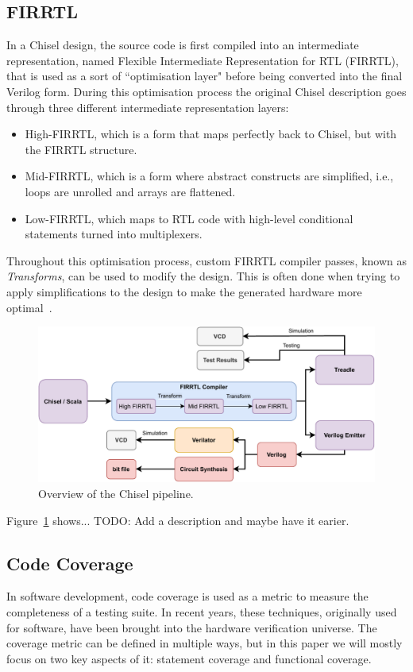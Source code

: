 \documentclass[runningheads]{llncs}
\newcommand{\todo}[1]{{\color{olive} TODO: #1}}
\begin{document}
\subsection{FIRRTL}
In a Chisel design, the source code is first compiled into an intermediate representation, named Flexible Intermediate Representation for RTL (FIRRTL), that is used as a sort of ``optimisation layer" before being converted into the final Verilog form. During this optimisation process the original Chisel description goes through three different intermediate representation layers:
\begin{itemize}
\item High-FIRRTL, which is a form that maps perfectly back to Chisel, but with the FIRRTL structure.
\item Mid-FIRRTL, which is a form where abstract constructs are simplified, i.e., loops are unrolled and arrays are flattened.
\item Low-FIRRTL, which maps to RTL code with high-level conditional statements turned into multiplexers.
\end{itemize}
Throughout this optimisation process, custom FIRRTL compiler passes, known as \textit{Transforms}, can be used to modify the design. This is often done when trying to apply simplifications to the design to make the generated hardware more optimal~\cite{firrtl}.  

\begin{figure}
    \centering
    \includegraphics[width=\textwidth]{Chisel_FIRRTL_VERILOG.pdf}
    \caption{Overview of the Chisel pipeline.}
\label{fig:chisel}
\end{figure}


Figure~\ref{fig:chisel} shows... \todo{Add a description and maybe have it earier.}

\subsection{Code Coverage}
In software development, code coverage is used as a metric to measure the completeness of a testing suite. In recent years, these techniques, originally used for software, have been brought into the hardware verification universe. The coverage metric can be defined in multiple ways, but in this paper we will mostly focus on two key aspects of it: statement coverage and functional coverage. 
\end{document}
